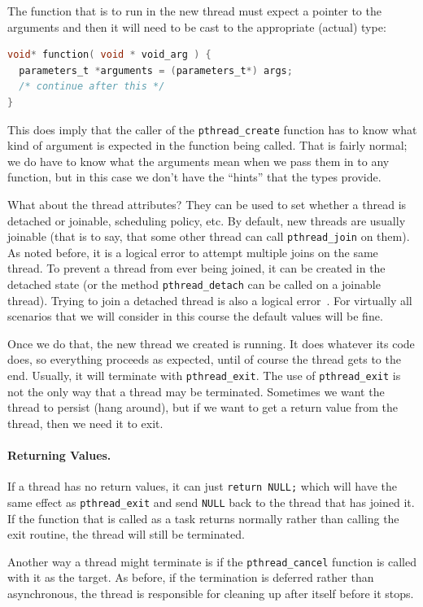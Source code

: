 The function that is to run in the new thread must expect a pointer to the arguments and then it will need to be cast to the appropriate (actual) type:
\begin{lstlisting}[language=C]
void* function( void * void_arg ) {
  parameters_t *arguments = (parameters_t*) args;
  /* continue after this */
}
\end{lstlisting}

This does imply that the caller of the \texttt{pthread\_create} function has to know what kind of argument is expected in the function being called. That is fairly normal; we do have to know what the arguments mean when we pass them in to any function, but in this case we don't have the ``hints'' that the types provide.

What about the thread attributes? They can be used to set whether a thread is detached or joinable, scheduling policy, etc. By default, new threads are usually joinable (that is to say, that some other thread can call \texttt{pthread\_join} on them). As noted before, it is a logical error to attempt multiple joins on the same thread. To prevent a thread from ever being joined, it can be created in the detached state (or the method \texttt{pthread\_detach} can be called on a joinable thread). Trying to join a detached thread is also a logical error~\cite{pthreads}. For virtually all scenarios that we will consider in this course the default values will be fine. 

Once we do that, the new thread we created is running. It does whatever its code does, so everything proceeds as expected, until of course the thread gets to the end. Usually, it will terminate with \texttt{pthread\_exit}. The use of \texttt{pthread\_exit} is not the only way that a thread may be terminated. Sometimes we want the thread to persist (hang around), but if we want to get a return value from the thread, then we need it to exit. 

\paragraph{Returning Values.} If a thread has no return values, it can just \texttt{return NULL;} which will have the same effect as \texttt{pthread\_exit} and send \texttt{NULL} back to the thread that has joined it. If the function that is called as a task returns normally rather than calling the exit routine, the thread will still be terminated. 

Another way a thread might terminate is if the \texttt{pthread\_cancel} function is called with it as the target. As before, if the termination is deferred rather than asynchronous, the thread is responsible for cleaning up after itself before it stops.

